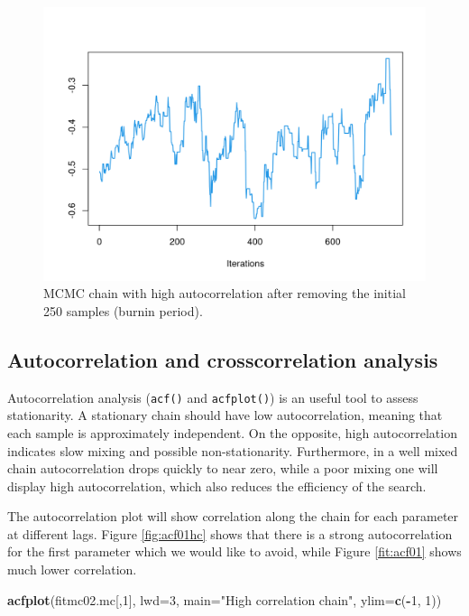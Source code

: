 \documentclass[
]{book}
\newenvironment{Shaded}{\begin{snugshade}}{\end{snugshade}}
\newcommand{\AttributeTok}[1]{\textcolor[rgb]{0.13,0.29,0.53}{#1}}
\newcommand{\DecValTok}[1]{\textcolor[rgb]{0.00,0.00,0.81}{#1}}
\newcommand{\FunctionTok}[1]{\textcolor[rgb]{0.13,0.29,0.53}{\textbf{#1}}}
\newcommand{\NormalTok}[1]{#1}
\newcommand{\SpecialCharTok}[1]{\textcolor[rgb]{0.81,0.36,0.00}{\textbf{#1}}}
\newcommand{\StringTok}[1]{\textcolor[rgb]{0.31,0.60,0.02}{#1}}
\begin{document}
\begin{figure}
\centering
\includegraphics{_bookdown_files/_main_files/figure-html/chain01b-1.png}
\caption{\label{fig:chain01b}MCMC chain with high autocorrelation after removing the initial 250 samples (burnin period).}
\end{figure}

\hypertarget{autocorrelation-and-crosscorrelation-analysis}{%
\subsection{Autocorrelation and crosscorrelation analysis}\label{autocorrelation-and-crosscorrelation-analysis}}

Autocorrelation analysis (\texttt{acf()} and \texttt{acfplot()}) is an useful tool to assess stationarity. A stationary chain should have low autocorrelation, meaning that each sample is approximately independent. On the opposite, high autocorrelation indicates slow mixing and possible non-stationarity. Furthermore, in a well mixed chain autocorrelation drops quickly to near zero, while a poor mixing one will display high autocorrelation, which also reduces the efficiency of the search.

The autocorrelation plot will show correlation along the chain for each parameter at different lags. Figure \ref{fig:acf01hc} shows that there is a strong autocorrelation for the first parameter which we would like to avoid, while Figure \ref{fit:acf01} shows much lower correlation.

\begin{Shaded}
\begin{Highlighting}[]
\FunctionTok{acfplot}\NormalTok{(fitmc02.mc[,}\DecValTok{1}\NormalTok{], }\AttributeTok{lwd=}\DecValTok{3}\NormalTok{, }\AttributeTok{main=}\StringTok{"High correlation chain"}\NormalTok{, }\AttributeTok{ylim=}\FunctionTok{c}\NormalTok{(}\SpecialCharTok{{-}}\DecValTok{1}\NormalTok{, }\DecValTok{1}\NormalTok{))}
\end{Highlighting}
\end{Shaded}
\end{document}
